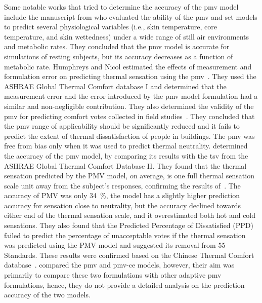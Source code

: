 Some notable works that tried to determine the accuracy of the \ac{pmv} model include the manuscript from  who evaluated the ability of the \ac{pmv} and \ac{set} models to predict several physiological variables (i.e., skin temperature, core temperature, and skin wettedness) under a wide range of still air environments and metabolic rates.
They concluded that the \ac{pmv} model is accurate for simulations of resting subjects, but its accuracy decreases as a function of metabolic rate.
Humphreys and Nicol estimated the effects of measurement and formulation error on predicting thermal sensation using the \ac{pmv}~\cite{Humphreys2000}.
They used the ASHRAE Global Thermal Comfort database I and determined that the measurement error and the error introduced by the \ac{pmv} model formulation had a similar and non-negligible contribution.
They also determined the validity of the \ac{pmv} for predicting comfort votes collected in field studies~\cite{Humphreys2002}.
They concluded that the \ac{pmv} range of applicability should be significantly reduced and it fails to predict the extent of thermal dissatisfaction of people in buildings.
The \ac{pmv} was free from bias only when it was used to predict thermal neutrality.
 determined the accuracy of the \ac{pmv} model, by comparing its results with the \ac{tsv} from the ASHRAE Global Thermal Comfort Database II.
They found that the thermal sensation predicted by the PMV model, on average, is one full thermal sensation scale unit away from the subject’s responses, confirming the results of~\cite{Humphreys2002}.
The accuracy of PMV was only \qty{34}{\percent}, the model has a slightly higher prediction accuracy for sensation close to neutrality, but the accuracy declined towards either end of the thermal sensation scale, and it overestimated both hot and cold sensations.
They also found that the Predicted Percentage of Dissatisfied (PPD) failed to predict the percentage of unacceptable votes if the thermal sensation was predicted using the PMV model and suggested its removal from \gls{55} Standards.
These results were confirmed based on the Chinese Thermal Comfort database~\cite{du_evaluation_2022}.
 compared the \ac{pmv} and \ac{pmv-ce} models, however, their aim was primarily to compare these two formulations with other adaptive \ac{pmv} formulations, hence, they do not provide a detailed analysis on the prediction accuracy of the two models.
